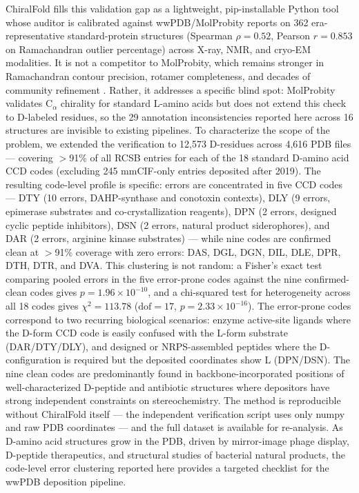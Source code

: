 \documentclass[11pt]{article}
\begin{document}
ChiralFold fills this validation gap as a lightweight, pip-installable Python tool whose auditor is calibrated against wwPDB/MolProbity reports on 362 era-representative standard-protein structures (Spearman $\rho=0.52$, Pearson $r=0.853$ on Ramachandran outlier percentage) across X-ray, NMR, and cryo-EM modalities. It is not a competitor to MolProbity, which remains stronger in Ramachandran contour precision, rotamer completeness, and decades of community refinement \citep{chen2010,lovell2003}. Rather, it addresses a specific blind spot: MolProbity validates C$_\alpha$ chirality for standard L-amino acids but does not extend this check to D-labeled residues, so the 29 annotation inconsistencies reported here across 16 structures are invisible to existing pipelines. To characterize the scope of the problem, we extended the verification to 12,573 D-residues across 4,616 PDB files --- covering $>$91\% of all RCSB entries for each of the 18 standard D-amino acid CCD codes (excluding 245 mmCIF-only entries deposited after 2019). The resulting code-level profile is specific: errors are concentrated in five CCD codes --- DTY (10 errors, DAHP-synthase and conotoxin contexts), DLY (9 errors, epimerase substrates and co-crystallization reagents), DPN (2 errors, designed cyclic peptide inhibitors), DSN (2 errors, natural product siderophores), and DAR (2 errors, arginine kinase substrates) --- while nine codes are confirmed clean at $>$91\% coverage with zero errors: DAS, DGL, DGN, DIL, DLE, DPR, DTH, DTR, and DVA. This clustering is not random: a Fisher's exact test comparing pooled errors in the five error-prone codes against the nine confirmed-clean codes gives $p=1.96\times10^{-10}$, and a chi-squared test for heterogeneity across all 18 codes gives $\chi^2=113.78$ ($\mathrm{dof}=17$, $p=2.33\times10^{-16}$). The error-prone codes correspond to two recurring biological scenarios: enzyme active-site ligands where the D-form CCD code is easily confused with the L-form substrate (DAR/DTY/DLY), and designed or NRPS-assembled peptides where the D-configuration is required but the deposited coordinates show L (DPN/DSN). The nine clean codes are predominantly found in backbone-incorporated positions of well-characterized D-peptide and antibiotic structures where depositors have strong independent constraints on stereochemistry. The method is reproducible without ChiralFold itself --- the independent verification script uses only numpy and raw PDB coordinates --- and the full dataset is available for re-analysis. As D-amino acid structures grow in the PDB, driven by mirror-image phage display, D-peptide therapeutics, and structural studies of bacterial natural products, the code-level error clustering reported here provides a targeted checklist for the wwPDB deposition pipeline.
\end{document}
